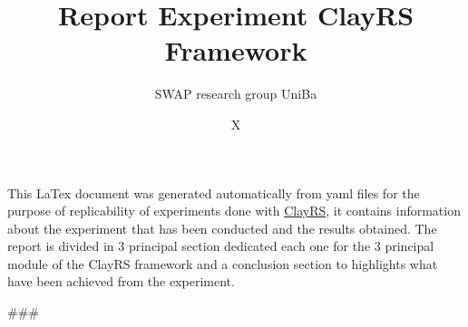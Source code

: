 \documentclass[11pt]{article}
\title{Report Experiment ClayRS Framework}
\author{SWAP research group UniBa}
\date{X}
\begin{document}
\maketitle
This LaTex document was generated automatically from yaml files for the purpose of replicability of experiments done with
\href{https://github.com/swapUniba/ClayRS}{ClayRS},
it contains information about the experiment that has been conducted and the results obtained.
The report is divided in 3 principal section dedicated each one for the 3 principal module of the ClayRS framework
and a conclusion section to highlights what have been achieved from the experiment.
\hfill\break
\hfill\break

###



\begin{comment}
Author = DIEGO MICCOLI
Alias = Kozen88
Organization = SWAP Research Group UniBa
Date = 27-12-2023

This mini template is not working by itself because there are latex command missing needed
to compile the file and give as output a pdf file, in addition it has been added jinja
statement in order to control the rendering of the latex file with the jinja library, for these
reasons it needs to be used with the other mini chunks in conjunction.
\end{comment}
\end{document}
